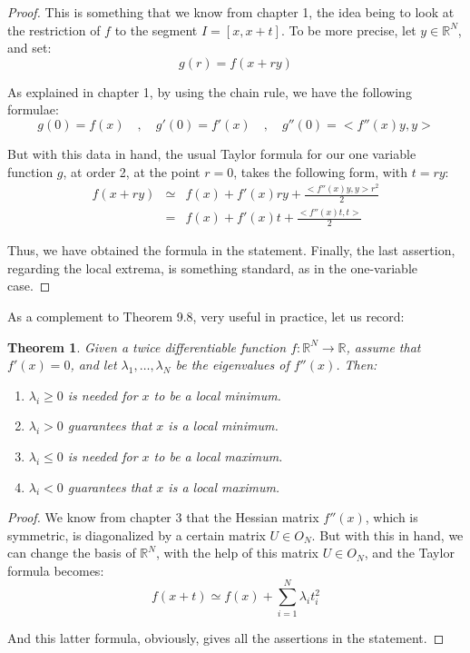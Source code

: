 \documentclass[12pt]{amsbook}
\newtheorem{theorem}{Theorem}[chapter]
\begin{document}
\begin{proof}
This is something that we know from chapter 1, the idea being to look at the restriction of $f$ to the segment $I=[x,x+t]$. To be more precise, let $y\in\mathbb R^N$, and set:
$$g(r)=f(x+ry)$$

As explained in chapter 1, by using the chain rule, we have the following formulae:
$$g(0)=f(x)\quad,\quad 
g'(0)=f'(x)\quad,\quad 
g''(0)=<f''(x)y,y>$$

But with this data in hand, the usual Taylor formula for our one variable function $g$, at order 2, at the point $r=0$, takes the following form, with $t=ry$:
\begin{eqnarray*}
f(x+ry)
&\simeq&f(x)+f'(x)ry+\frac{<f''(x)y,y>r^2}{2}\\
&=&f(x)+f'(x)t+\frac{<f''(x)t,t>}{2}
\end{eqnarray*}

Thus, we have obtained the formula in the statement. Finally, the last assertion, regarding the local extrema, is something standard, as in the one-variable case.
\end{proof}

As a complement to Theorem 9.8, very useful in practice, let us record:


\begin{theorem}
Given a twice differentiable function $f:\mathbb R^N\to\mathbb R$, assume that $f'(x)=0$, and let $\lambda_1,\ldots,\lambda_N$ be the eigenvalues of $f''(x)$. Then:
\begin{enumerate}
\item $\lambda_i\geq0$ is needed for $x$ to be a local minimum.

\item $\lambda_i>0$ guarantees that $x$ is a local minimum.

\item $\lambda_i\leq0$ is needed for $x$ to be a local maximum.

\item $\lambda_i<0$ guarantees that $x$ is a local maximum.
\end{enumerate}
\end{theorem}

\begin{proof}
We know from chapter 3 that the Hessian matrix $f''(x)$, which is symmetric, is diagonalized by a certain matrix $U\in O_N$. But with this in hand, we can change the basis of $\mathbb R^N$, with the help of this matrix $U\in O_N$, and the Taylor formula becomes:
$$f(x+t)\simeq f(x)+\sum_{i=1}^N\lambda_it_i^2$$

And this latter formula, obviously, gives all the assertions in the statement.
\end{proof}
\end{document}
